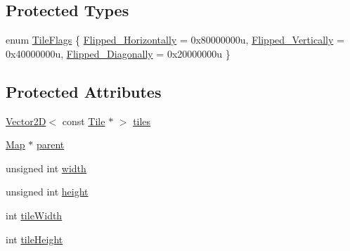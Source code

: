 \subsection*{Protected Types}
\begin{DoxyCompactItemize}
\item 
enum \hyperlink{classZeta_1_1Layer_ab1768053815c074b3c2d67ef0febbe62}{Tile\+Flags} \{ \hyperlink{classZeta_1_1Layer_ab1768053815c074b3c2d67ef0febbe62ab8105bd631a70bfb79613af0a6b6b2af}{Flipped\+\_\+\+Horizontally} = 0x80000000u, 
\hyperlink{classZeta_1_1Layer_ab1768053815c074b3c2d67ef0febbe62a1a365f133a94cd971fa2f048af328f1a}{Flipped\+\_\+\+Vertically} = 0x40000000u, 
\hyperlink{classZeta_1_1Layer_ab1768053815c074b3c2d67ef0febbe62a0023f8ea7cfb1575d730ad65b8c0accc}{Flipped\+\_\+\+Diagonally} = 0x20000000u
 \}
\end{DoxyCompactItemize}
\subsection*{Protected Attributes}
\begin{DoxyCompactItemize}
\item 
\hyperlink{classZeta_1_1Vector2D}{Vector2\+D}$<$ const \hyperlink{classZeta_1_1Tile}{Tile} $\ast$ $>$ \hyperlink{classZeta_1_1Layer_ad2debb7e51a62d88aade1a49b8e30c62}{tiles}
\item 
\hyperlink{classZeta_1_1Map}{Map} $\ast$ \hyperlink{classZeta_1_1Layer_aadb72623ad904047668639af8c78e01d}{parent}
\item 
unsigned int \hyperlink{classZeta_1_1Layer_a31e7f0ffc14b15386dfe57954c0b3014}{width}
\item 
unsigned int \hyperlink{classZeta_1_1Layer_adba7108294edeeda935d66231cfb373c}{height}
\item 
int \hyperlink{classZeta_1_1Layer_a1fb367fb1511d1eda90d13921870e5b7}{tile\+Width}
\item 
int \hyperlink{classZeta_1_1Layer_ad484e0330d01061ce13220c964bf1622}{tile\+Height}
\end{DoxyCompactItemize}


